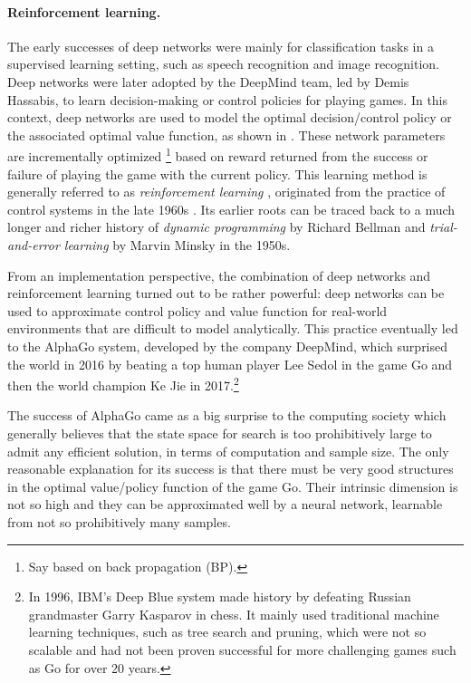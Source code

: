\documentclass[../../book-main.tex]{subfiles}
\begin{document}
\paragraph{Reinforcement learning.}
The early successes of deep networks were mainly for classification tasks in a supervised learning setting, such as speech recognition and image recognition. Deep networks were later adopted by the DeepMind team, led by Demis Hassabis, to learn decision-making or control policies for playing games. In this context, deep networks are used to model the optimal decision/control policy or the associated optimal value function, as shown in . These network parameters are incrementally optimized \footnote{Say based on back propagation (BP).} based on reward returned from the success or failure of playing the game with the current policy. This learning method is generally referred to as {\em reinforcement learning} \cite{Sutton-Barto}, originated from the practice of control systems in the late 1960s \cite{Waltz1965AHA,Mendel1970ReinforcementlearningCA}. Its earlier roots can be traced back to a much longer and richer history of {\em dynamic programming} by Richard Bellman \cite{Bellman-DP} and {\em trial-and-error learning} by Marvin Minsky \cite{Minsky-1954} in the 1950s. 

From an implementation perspective, the combination of deep networks and reinforcement learning turned out to be rather powerful: deep networks can be used to approximate control policy and value function for real-world environments that are difficult to model analytically. This practice eventually led to the AlphaGo system, developed by the company DeepMind, which surprised the world in 2016 by beating a top human player Lee Sedol in the game Go and then the world champion Ke Jie in 2017.\footnote{In 1996, IBM's Deep Blue system made history by defeating Russian grandmaster Garry Kasparov in chess. It mainly used traditional machine learning techniques, such as tree search and pruning, which were not so scalable and had not been proven successful for more challenging games such as Go for over 20 years.} 

The success of AlphaGo came as a big surprise to the computing society which generally believes that the state space for search is too prohibitively large to admit any efficient solution, in terms of computation and sample size. The only reasonable explanation for its success is that there must be very good structures in the optimal value/policy function of the game Go. Their intrinsic dimension is not so high and they can be approximated well by a neural network, learnable from not so prohibitively many samples. 
\end{document}
